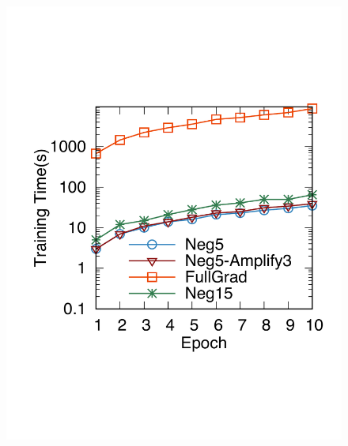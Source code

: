 \begin{figure}[ht]
\begin{minipage}{.31\textwidth}
		\label{fig:l2Loss}
	\end{minipage}%
	\begin{minipage}{.31\textwidth}
		\centering
		\captionsetup{justification=centering,margin=0.1cm}
		\includegraphics[width=1\linewidth]{Graph/negSamp/theoryTime.pdf}


\end{minipage}
\end{figure}
